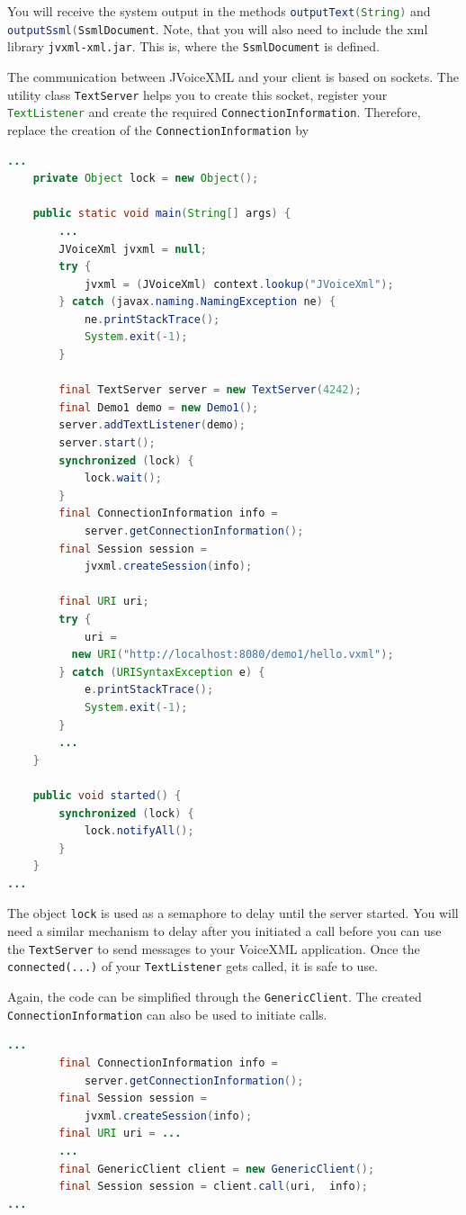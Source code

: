 \documentclass[11pt,a4paper]{book}
\begin{document}
You will receive the system output in the methods
\lstinline[language=Java]{outputText(String)} and
\lstinline[language=Java]{outputSsml(SsmlDocument}. Note, that you will also
need to include the xml library \texttt{jvxml-xml.jar}. This is, where the
\lstinline[language=Java]{SsmlDocument} is defined.

The communication between JVoiceXML and your client is based on sockets. The
utility class \lstinline[language=Java]{TextServer} helps you to create this
socket, register your \lstinline[language=Java]{TextListener} and create the
required \lstinline[language=Java]{ConnectionInformation}. Therefore, replace
the creation of the \lstinline[language=Java]{ConnectionInformation} by

\begin{lstlisting}[language=Java]
...
    private Object lock = new Object();

    public static void main(String[] args) {
        ...
        JVoiceXml jvxml = null;
        try {
            jvxml = (JVoiceXml) context.lookup("JVoiceXml");
        } catch (javax.naming.NamingException ne) {
            ne.printStackTrace();
            System.exit(-1);
        }

        final TextServer server = new TextServer(4242);
        final Demo1 demo = new Demo1();
        server.addTextListener(demo);
        server.start();
        synchronized (lock) {
            lock.wait();
        }
        final ConnectionInformation info =
            server.getConnectionInformation();
        final Session session = 
            jvxml.createSession(info);

        final URI uri;
        try {
            uri = 
          new URI("http://localhost:8080/demo1/hello.vxml");
        } catch (URISyntaxException e) {
            e.printStackTrace();
            System.exit(-1);
        }
        ...
    }

    public void started() {
        synchronized (lock) {
            lock.notifyAll();
        }
    }
...
\end{lstlisting}

The object \lstinline[language=Java]{lock} is used as a semaphore to delay until
the server started. You will need a similar mechanism to delay after you
initiated a call before you can use the \lstinline{TextServer} to send messages
to your VoiceXML application. Once the \lstinline{connected(...)} of your
\lstinline{TextListener} gets called, it is safe to use.

Again, the code can be simplified through the \lstinline{GenericClient}.
The created \lstinline{ConnectionInformation} can also be used to initiate
calls.
 \begin{lstlisting}[language=Java]
 ...
        final ConnectionInformation info =
            server.getConnectionInformation();
        final Session session = 
            jvxml.createSession(info);
        final URI uri = ...
        ...
        final GenericClient client = new GenericClient();
        final Session session = client.call(uri,  info);
...
\end{lstlisting}
\end{document}
